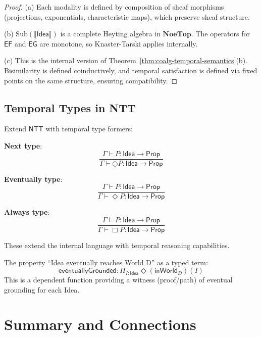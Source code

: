 \begin{proof}
(a) Each modality is defined by composition of sheaf morphisms (projections,
exponentials, characteristic maps), which preserve sheaf structure.

(b) $\mathrm{Sub}(\llbracket \mathsf{Idea} \rrbracket)$ is a complete Heyting algebra
in $\mathbf{NoeTop}$. The operators for $\mathsf{EF}$ and $\mathsf{EG}$ are monotone,
so Knaster-Tarski applies internally.

(c) This is the internal version of Theorem~\ref{thm:coalg-temporal-semantics}(b).
Bisimilarity is defined coinductively, and temporal satisfaction is defined via
fixed points on the same structure, ensuring compatibility.
\end{proof}

\subsection{Temporal Types in NTT}
\label{subsec:temporal-types-ntt}

\begin{definition}
\label{def:temporal-type-formers}
Extend $\mathsf{NTT}$ with temporal type formers:

\textbf{Next type}:
\[
  \frac{\Gamma \vdash P : \mathsf{Idea} \to \mathsf{Prop}}
       {\Gamma \vdash \bigcirc P : \mathsf{Idea} \to \mathsf{Prop}}
\]

\textbf{Eventually type}:
\[
  \frac{\Gamma \vdash P : \mathsf{Idea} \to \mathsf{Prop}}
       {\Gamma \vdash \Diamond P : \mathsf{Idea} \to \mathsf{Prop}}
\]

\textbf{Always type}:
\[
  \frac{\Gamma \vdash P : \mathsf{Idea} \to \mathsf{Prop}}
       {\Gamma \vdash \Box P : \mathsf{Idea} \to \mathsf{Prop}}
\]

These extend the internal language with temporal reasoning capabilities.
\end{definition}

\begin{example}
\label{ex:typed-temporal}
The property ``Idea eventually reaches World D'' as a typed term:
\[
  \mathsf{eventuallyGrounded} : \Pi_{I : \mathsf{Idea}} \Diamond(\mathsf{inWorld}_D)(I)
\]
This is a dependent function providing a witness (proof/path) of eventual grounding
for each Idea.
\end{example}

\section{Summary and Connections}
\label{sec:coalgebra-summary}

